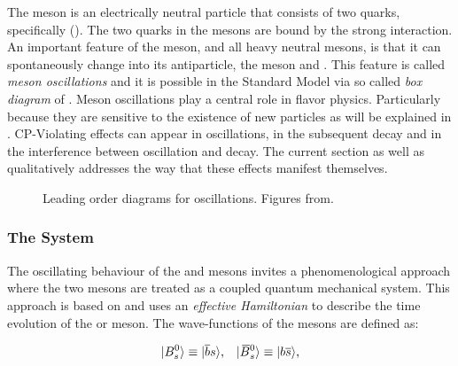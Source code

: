 The \Bs meson is an electrically neutral particle that consists of two quarks, specifically (\bquarkbar\squark).
The two quarks in the mesons are bound by the strong interaction. An important feature of
the \Bs meson, and all heavy neutral mesons, is that it can spontaneously change into its antiparticle,
the \Bsb meson and \viceversa. This feature is called {\it meson oscillations} and it is possible
in the Standard Model via so called {\it box diagram} of .
Meson oscillations play a central role in flavor physics. Particularly because they are sensitive to the
existence of new particles as will be explained in . CP-Violating effects can
appear in \BBbarSyst oscillations, in the subsequent decay and in the interference between oscillation
and decay. The current section as well as  qualitatively addresses the way that
these effects manifest themselves.

\begin{figure}[!h]
  \centering
  \begin{subfigure}{0.5\textwidth}
    \raggedright
    \centering
    \scalebox{0.9}{\sffamily }
    \caption{}
    \label{bs_box_1}
  \end{subfigure}%
  \hfill%
  \begin{subfigure}{0.5\textwidth}
    \raggedleft
    \centering
    \scalebox{0.9}{\sffamily }
    \caption{}
    \label{bs_box_2}
  \end{subfigure}
  \caption{Leading order diagrams for \BBbarSyst oscillations. Figures from\cite{jeroenThesis}.}
  \label{bs_box}
\end{figure}

\subsubsection{The \BBbarSyst System}
\label{the_bbar_system}

The oscillating behaviour of the \Bs and \Bsb mesons invites a phenomenological approach
where the two mesons are treated as a coupled quantum mechanical system. This approach
is based on\cite{Weisskopf:1930au,Weisskopf:1930ps} and uses an {\it effective Hamiltonian}\cite{eff-hamiltonian-bs-syst,DeBruyn-thesis}
to describe the time evolution of the \Bs or \Bsb meson. The wave-functions of the mesons
are defined as:

\begin{equation}
  \centering
  \ket{\Bs}  \equiv  \ket{\bquarkbar\squark}, \;\;\; \ket{\Bsb} \equiv  \ket{\bquark\squarkbar},
  \label{bs_wavefunctions}
\end{equation}

